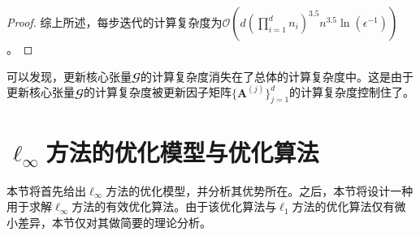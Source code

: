 \begin{proof}
综上所述，每步迭代的计算复杂度为$\mathcal{O}(d(\prod_{i=1}^{d}n_{i})^{3.5}n^{3.5}\ln(\epsilon^{-1}))$。
\end{proof}\vspace{0.5em}

可以发现，更新核心张量$\mathbfcal{G}$的计算复杂度消失在了总体的计算复杂度中。这是由于更新核心张量$\mathbfcal{G}$的计算复杂度被更新因子矩阵$\{\boldsymbol{A}^{(j)}\}_{j=1}^{d}$的计算复杂度控制住了。




\section{$\ell_{\infty}$方法的优化模型与优化算法}
本节将首先给出$\ell_{\infty}$方法的优化模型，并分析其优势所在。之后，本节将设计一种用于求解$\ell_{\infty}$方法的有效优化算法。由于该优化算法与$\ell_{1}$方法的优化算法仅有微小差异，本节仅对其做简要的理论分析。

